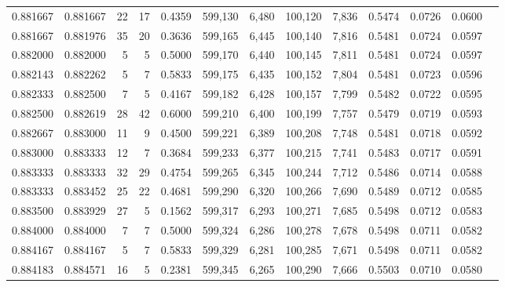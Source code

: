 \begin{tabular}{rrrrrrrrrrrrr}
0.881667 & 0.881667 &    22 &  17 &                                     0.4359 & 599,130 &   6,480 & 100,120 &   7,836 & 0.5474 & 0.0726 & 0.0600 \\
0.881667 & 0.881976 &    35 &  20 &                                     0.3636 & 599,165 &   6,445 & 100,140 &   7,816 & 0.5481 & 0.0724 & 0.0597 \\
0.882000 & 0.882000 &     5 &   5 &                                     0.5000 & 599,170 &   6,440 & 100,145 &   7,811 & 0.5481 & 0.0724 & 0.0597 \\
0.882143 & 0.882262 &     5 &   7 &                                     0.5833 & 599,175 &   6,435 & 100,152 &   7,804 & 0.5481 & 0.0723 & 0.0596 \\
0.882333 & 0.882500 &     7 &   5 &                                     0.4167 & 599,182 &   6,428 & 100,157 &   7,799 & 0.5482 & 0.0722 & 0.0595 \\
0.882500 & 0.882619 &    28 &  42 &                                     0.6000 & 599,210 &   6,400 & 100,199 &   7,757 & 0.5479 & 0.0719 & 0.0593 \\
0.882667 & 0.883000 &    11 &   9 &                                     0.4500 & 599,221 &   6,389 & 100,208 &   7,748 & 0.5481 & 0.0718 & 0.0592 \\
0.883000 & 0.883333 &    12 &   7 &                                     0.3684 & 599,233 &   6,377 & 100,215 &   7,741 & 0.5483 & 0.0717 & 0.0591 \\
0.883333 & 0.883333 &    32 &  29 &                                     0.4754 & 599,265 &   6,345 & 100,244 &   7,712 & 0.5486 & 0.0714 & 0.0588 \\
0.883333 & 0.883452 &    25 &  22 &                                     0.4681 & 599,290 &   6,320 & 100,266 &   7,690 & 0.5489 & 0.0712 & 0.0585 \\
0.883500 & 0.883929 &    27 &   5 &                                     0.1562 & 599,317 &   6,293 & 100,271 &   7,685 & 0.5498 & 0.0712 & 0.0583 \\
0.884000 & 0.884000 &     7 &   7 &                                     0.5000 & 599,324 &   6,286 & 100,278 &   7,678 & 0.5498 & 0.0711 & 0.0582 \\
0.884167 & 0.884167 &     5 &   7 &                                     0.5833 & 599,329 &   6,281 & 100,285 &   7,671 & 0.5498 & 0.0711 & 0.0582 \\
0.884183 & 0.884571 &    16 &   5 &                                     0.2381 & 599,345 &   6,265 & 100,290 &   7,666 & 0.5503 & 0.0710 & 0.0580 \\

\end{tabular}
